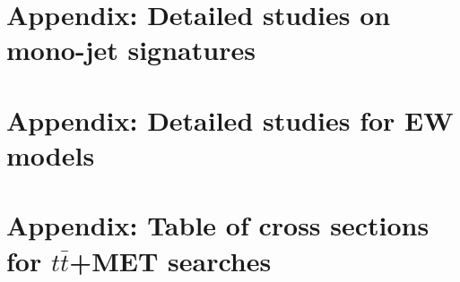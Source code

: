 \documentclass[a4,debug,notitlepage,nobib]{tufte-book}
\begin{document}

\appendix

\chapter{Appendix: Detailed studies on mono-jet signatures}
\label{app:MonojetLikeModels_Appendix}


\chapter{Appendix: Detailed studies for EW models}
\label{app:EWSpecificModels_Appendix}


\chapter{Appendix: Table of cross sections for $t\bar{t}$+MET searches}
\label{app:TTBar_Xsecs}


% 


\end{document}
